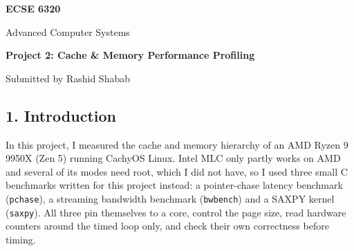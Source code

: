\documentclass[10pt,letterpaper]{article}
\begin{document}
\begin{titlepage}
\thispagestyle{empty}
\centering
\vspace*{1.2in}
{\Large\bfseries ECSE 6320\par}
\vspace{0.3in}
{\Large Advanced Computer Systems\par}
\vspace{0.9in}
{\LARGE\bfseries Project 2: Cache \& Memory Performance Profiling\par}
\vspace{0.9in}
{\large Submitted by Rashid Shabab\par}
\vfill
\end{titlepage}
\setcounter{page}{2}
\tableofcontents
\clearpage
\hypertarget{introduction}{%
\subsection{1. Introduction}\label{introduction}}

In this project, I measured the cache and memory hierarchy
of an AMD Ryzen 9 9950X (Zen 5) running CachyOS Linux. Intel
MLC only partly works on AMD and several of its modes need
root, which I did not have, so I used three small C
benchmarks written for this project instead: a pointer-chase
latency benchmark (\texttt{pchase}), a streaming bandwidth
benchmark (\texttt{bwbench}) and a SAXPY kernel
(\texttt{saxpy}). All three pin themselves to a core,
control the page size, read hardware counters around the
timed loop only, and check their own correctness before
timing.
\end{document}
